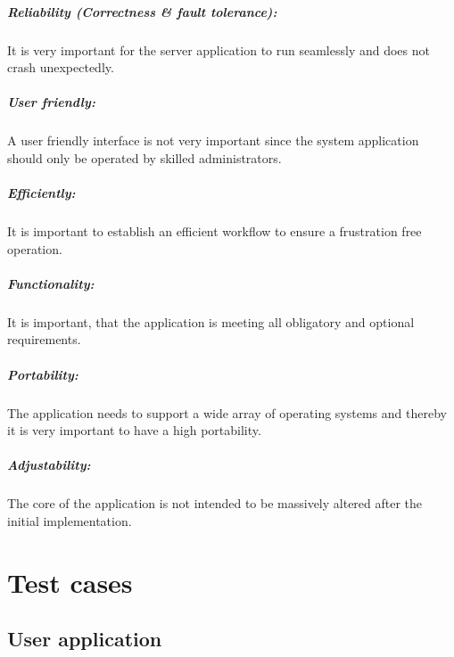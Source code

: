 \paragraph{Reliability (Correctness \& fault tolerance):}

It is very important for the server application to run seamlessly and does not crash unexpectedly.

\paragraph{User friendly:}

A user friendly interface is not very important since the system application should only be operated by skilled administrators.

\paragraph{Efficiently:}

It is important to establish an efficient workflow to ensure a frustration free operation. 

\paragraph{Functionality:}

It is important, that the application is meeting all obligatory and optional requirements.

\paragraph{Portability:}

The application needs to support a wide array of operating systems and thereby it is very important to have a high portability.

\paragraph{Adjustability:}

The core of the application is not intended to be massively altered after the initial implementation.  

\chapter{Test cases}

\section{User application}

